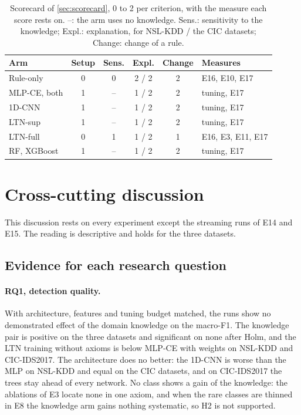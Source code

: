 \begin{table}[t]
\centering
\footnotesize
\caption{Scorecard of \cref{sec:scorecard}, 0 to 2 per criterion, with the measure each score rests on. --: the arm uses
no knowledge. Sens.: sensitivity to the knowledge; Expl.: explanation, for NSL-KDD / the CIC datasets; Change: change
of a rule.}
\label{tab:res-scorecard}
\setlength{\tabcolsep}{4pt}
\begin{tabular}{@{}lcccc l@{}}
\toprule
Arm & Setup & Sens. & Expl. & Change & Measures \\
\midrule
Rule-only & 0 & 0 & 2 / 2 & 2 & E16, E10, E17 \\
MLP-CE, both & 1 & -- & 1 / 2 & 2 & tuning, E17 \\
1D-CNN & 1 & -- & 1 / 2 & 2 & tuning, E17 \\
LTN-sup & 1 & -- & 1 / 2 & 2 & tuning, E17 \\
LTN-full & 0 & 1 & 1 / 2 & 1 & E16, E3, E11, E17 \\
RF, XGBoost & 1 & -- & 1 / 2 & 2 & tuning, E17 \\
\bottomrule
\end{tabular}
\end{table}

\section{Cross-cutting discussion}
\label{sec:res-discussion}

This discussion rests on every experiment except the streaming runs of E14 and E15. The reading is descriptive and
holds for the three datasets.

\subsection{Evidence for each research question}
\label{sec:res-rqs}

\paragraph{RQ1, detection quality.}
With architecture, features and tuning budget matched, the runs show no demonstrated effect of the domain knowledge on
the macro-F1. The knowledge pair is positive on the three datasets and significant on none after Holm, and the LTN
training without axioms is below MLP-CE with weights on NSL-KDD and CIC-IDS2017. The architecture does no better: the
1D-CNN is worse than the MLP on NSL-KDD and equal on the CIC datasets, and on CIC-IDS2017 the trees stay ahead of every
network. No class shows a gain of the knowledge: the ablations of E3 locate none in one axiom, and when the rare classes
are thinned in E8 the knowledge arm gains nothing systematic, so H2 is not supported.

